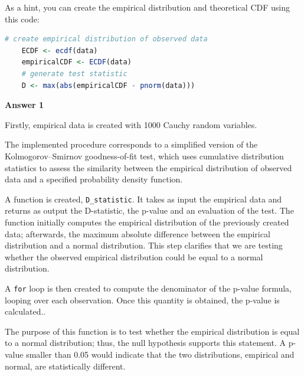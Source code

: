 \documentclass[12pt,letterpaper]{article}
\begin{document}
	
\noindent As a hint, you can create the empirical distribution and theoretical CDF using this code:

\begin{lstlisting}[language=R]
	# create empirical distribution of observed data
	ECDF <- ecdf(data)
	empiricalCDF <- ECDF(data)
	# generate test statistic
	D <- max(abs(empiricalCDF - pnorm(data))) \end{lstlisting}

\vspace{2cm}

\noindent\textbf{Answer 1}\\
\vspace{0.5cm}

\noindent Firstly, empirical data is created with 1000 Cauchy random variables. 

\vspace{0.5cm}


\noindent The implemented procedure corresponds to a simplified version of the Kolmogorov--Smirnov goodness-of-fit test, which uses cumulative distribution statistics to assess the similarity between the empirical distribution of observed data and a specified probability density function.

\noindent A function is created, \texttt{D\_statistic}. It takes as input the empirical data and returns as output the D-statistic, the p-value and an evaluation of the test. The function initially computes the empirical distribution of the previously created data; afterwards, the maximum absolute difference between the empirical distribution and a normal distribution. This step clarifies that we are testing whether the observed empirical distribution could be equal to a normal distribution.

\noindent A \texttt{for} loop is then created to compute the denominator of the p-value formula, looping over each observation. Once this quantity is obtained, the p-value is calculated..

\noindent The purpose of this function is to test whether the empirical distribution is equal to a normal distribution; thus, the null hypothesis supports this statement. A p-value smaller than 0.05 would indicate that the two distributions, empirical and normal, are statistically different.

\vspace{0.5cm}

\end{document}
